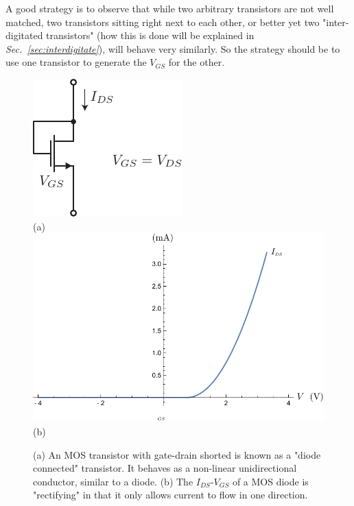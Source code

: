 A good strategy is to observe that while two arbitrary transistors are not well matched, two transistors sitting right next to each other, or better yet two "inter-digitated transistors" (how this is done will be explained in \emph{Sec.~\ref{sec:interdigitate}}), will behave very similarly.  So the strategy should be to use one transistor to generate the $V_{GS}$ for the other.
\newpage
\begin{figure}[t]
\centering
\includegraphics[scale=1.25]{3mos_diode.pdf}\\
(a)\\[0.25cm]
\includegraphics[width=.7\columnwidth]{ivrect.pdf}\\
(b)
\caption{(a) An MOS transistor with gate-drain shorted is known as a "diode connected" transistor.  It behaves as a non-linear unidirectional conductor, similar to a diode.  (b) The $I_{DS}$-$V_{GS}$ of a MOS diode is "rectifying" in that it only allows current to flow in one direction.}
\label{fig:3mos_diode.pdf}
\end{figure}
